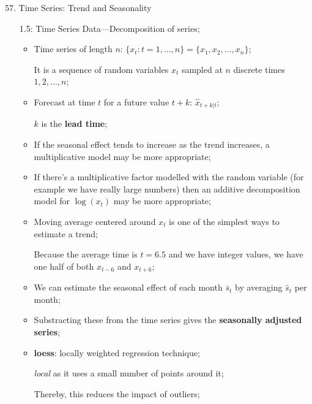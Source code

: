 \documentclass[12pt, titlepage, french]{report}
\begin{document}
\begin{CHPT_SUMM_AUTO}[label = {L.-57}]{57. Time Series: Trend and Seasonality}
\begin{itemize}
\begin{itemize}
		\texttt{[image: src/TS-TREND-SPLIT-PLOTS.png]}
		\item	This also highlights the importance of not extrapolating---without additional information we don't know whether the trend will continue;
		\item	Idea that 2 unrelated time series will be correlated if they both contain a trend thus we can't attribute global warming to fossil fuel increase without a physical explanation;
		\item	As per scientists, we judge appropriate to attribute a \textbf{causal relationship} and to expect mean global temperature to continue rising if greenhouse gas emissions aren't reduced;
		\end{itemize}
	\item[1.5:]	Time Series Data---Decomposition of series;
		\begin{itemize}
	\item	Time series of length $n$: $\{x_{t} : t = 1, \dots, n\} = \{x_{1}, x_{2}, \dots, x_{n}\}$;
	\item[]	It is a sequence of random variables $x_{t}$ sampled at $n$ discrete times $1, 2, \dots, n$;
	\item	Forecast at time $t$ for a future value $t + k$: $\hat{x}_{t + k | t}$;
	\item[]	$k$ is the \textbf{lead time};
		\end{itemize}
		\begin{itemize}
		\item	If the seasonal effect tends to increase as the trend increases, a multiplicative model may be more appropriate;
		\item	If there's a multiplicative factor modelled with the random variable (for example we have really large numbers) then an additive decomposition model for $\log(x_{t})$ may be more appropriate;
		\end{itemize}
		\begin{itemize}
		\item	Moving average centered around $x_{t}$ is one of the simplest ways to estimate a trend;
		\item[]	Because the average time is $t = 6.5$ and we have integer values, we have one half of both $x_{t - 6}$ and $x_{t + 6}$;
		\item	We can estimate the seasonal effect of each month $\bar{s}_{t}$ by averaging $\hat{s}_{t}$ per month;
		\item	Substracting these from the time series gives the \textbf{seasonally adjusted series};
		\end{itemize}
		\begin{itemize}
		\item	\textbf{loess}: locally weighted regression technique;
		\item[]	\og \textit{local} \fg{} as it uses a \og small \fg{}  number of points \og around \fg{}  it;
		\item[]	Thereby, this reduces the impact of outliers;
		

\end{itemize}
\end{itemize}
\end{CHPT_SUMM_AUTO}
\end{document}
